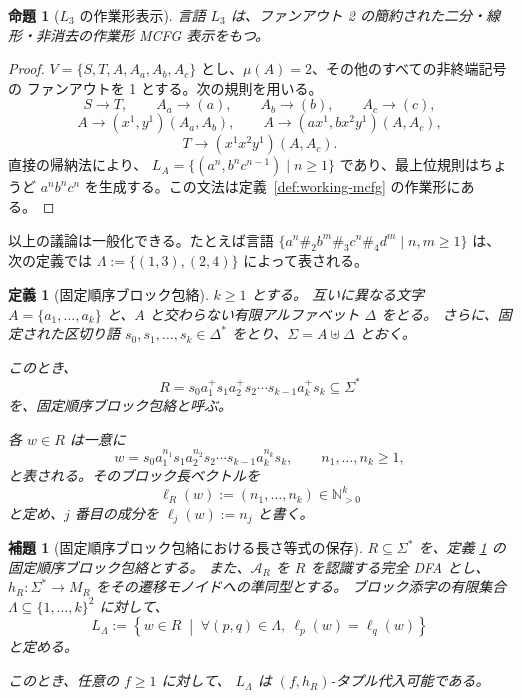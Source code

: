\documentclass[11pt,a4paper]{ltjsarticle}
\newtheorem{lemma}[theorem]{補題}
\newtheorem{proposition}[theorem]{命題}
\newtheorem{definition}[theorem]{定義}
\theoremstyle{remark}
\begin{document}
\begin{proposition}[\(L_3\) の作業形表示]
\label{prop:l3-running-example}
言語 \(L_3\) は、ファンアウト 2 の簡約された二分・線形・非消去の作業形 MCFG 表示をもつ。
\end{proposition}

\begin{proof}
\(V=\{S,T,A,A_a,A_b,A_c\}\) とし、\(\mu(A)=2\)、その他のすべての非終端記号の
ファンアウトを 1 とする。次の規則を用いる。
\[
  S\to T,\qquad A_a\to(a),\qquad A_b\to(b),\qquad A_c\to(c),
\]
\[
  A\to(x^1,y^1)(A_a,A_b),\qquad
  A\to(a x^1,b x^2 y^1)(A,A_c),
\]
\[
  T\to(x^1x^2y^1)(A,A_c).
\]
直接の帰納法により、
\(L_A=\{(a^n,b^n c^{n-1})\mid n\ge1\}\) であり、最上位規則はちょうど
\(a^n b^n c^n\) を生成する。この文法は定義~\ref{def:working-mcfg} の作業形にある。
\end{proof}



以上の議論は一般化できる。たとえば言語 \(\{a^n\#_2b^m\#_3c^n\#_4d^m\mid n,m\ge1\}\) は、次の定義では \(\Lambda:=\{(1,3),(2,4)\}\) によって表される。

\begin{definition}[固定順序ブロック包絡]
\label{def:fixed-ordered-block-envelope}
\(k\ge 1\) とする。
互いに異なる文字 \(A=\{a_1,\ldots,a_k\}\)
と、\(A\) と交わらない有限アルファベット \(\Delta\) をとる。
さらに、固定された区切り語 \(s_0,s_1,\ldots,s_k\in\Delta^*\)
をとり、\(\Sigma=A\uplus\Delta\)
とおく。

このとき、
\[
  R
  =
  s_0a_1^+s_1a_2^+s_2\cdots s_{k-1}a_k^+s_k
  \subseteq\Sigma^*
\]
を、\emph{固定順序ブロック包絡}と呼ぶ。

各 \(w\in R\) は一意に
\[
  w
  =
  s_0a_1^{n_1}s_1a_2^{n_2}s_2
  \cdots
  s_{k-1}a_k^{n_k}s_k,
  \qquad
  n_1,\ldots,n_k\ge1,
\]
と表される。そのブロック長ベクトルを
\[
  \ell_R(w)
  :=
  (n_1,\ldots,n_k)
  \in\mathbb{N}_{>0}^k
\]
と定め、\(j\) 番目の成分を \(\ell_j(w):=n_j\) と書く。
\end{definition}

\begin{lemma}[固定順序ブロック包絡における長さ等式の保存]
\label{lem:block-equality-envelopes}
\(R\subseteq\Sigma^*\) を、定義
\ref{def:fixed-ordered-block-envelope}
の固定順序ブロック包絡とする。
また、\(\mathcal A_R\) を \(R\) を認識する完全 DFA とし、\(h_R:\Sigma^*\longrightarrow M_R\)
をその遷移モノイドへの準同型とする。
ブロック添字の有限集合 \(\Lambda\subseteq\{1,\ldots,k\}^2\)
に対して、
\[
  L_\Lambda
  :=
  \left\{
    w\in R
    \;\middle|\;
    \forall (p,q)\in\Lambda,\ 
    \ell_p(w)=\ell_q(w)
  \right\}
\]
と定める。

このとき、任意の \(f\ge1\) に対して、
\(L_\Lambda\) は \((f,h_R)\)-タプル代入可能である。
\end{lemma}
\end{document}
